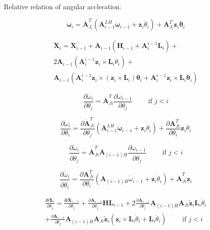 \documentclass{article}
\begin{document}
Relative relation of angular accleration:


\begin{equation}
	\mathbf{\dot \omega}_i = 
	\mathbf{\dot A}^{T}_{J_i}
(\mathbf{A}^{LH}_{i-1}\mathbf{\dot \omega}_{i-1}+\mathbf{z}_i\dot{\theta}_i) 
	+\mathbf{A}^T_{J_i}\mathbf{z}_i\mathbf{\ddot \theta}_{i}
\end{equation}

\begin{eqnarray}
\ddot{\mathbf X}_i=\ddot{\mathbf X}_{i-1} + \mathbf{\ddot A}_{i-1}
(\mathbf{H}_{i-1}+\mathbf{A}^{i-1}_i\mathbf{L}_i) +  \nonumber\\
2\mathbf{\dot A}_{i-1}
(\mathbf{A}^{i-1}_i{\mathbf z}_i{\times}\mathbf{L}_i\dot{\theta}_i) + \nonumber\\
\mathbf{A}_{i-1}
({\mathbf A}^{i-1}_i\mathbf{z}_i{\times}(\mathbf{z}_i{\times}{\mathbf L}_i)\mathbf{\dot \theta}_i+{\mathbf A}^{i-1}_i\mathbf{z}_i{\times}{\mathbf L}_i\mathbf{\ddot \theta}_i)
\end{eqnarray}

\begin{equation}
\frac{\partial \dot{\omega}_i}{\partial \theta_j}=\dot{\mathbf A}^T_{Ji}
\frac{\partial \dot{\omega}_{i-1}}{\partial \theta_j}
	\qquad \textrm{  if  } j < i
\end{equation}

\begin{equation}
\frac{\partial \dot{\omega}_i}{\partial \theta_i}=\frac{\partial \dot{\mathbf A}^T_{Ji}}{\partial \theta_j}
(\mathbf{A}^{LH}_{i-1}\mathbf{\dot \omega}_{i-1}+\mathbf{z}_i\dot{\theta}_i)+\frac{\partial \mathbf{A}^T_{Ji}}{\partial \theta_i}\mathbf{z}_i\ddot{\theta}_i 
\end{equation}


\begin{equation}
\frac{\partial \dot{\omega}_i}{\partial \dot{\theta}_j}=\dot{\mathbf A}^T_{Ji}\mathbf{A}_{(i-1)H}
\frac{\partial \dot{\omega}_{i-1}}{\partial \dot{\theta}_j}
	\qquad \textrm{  if  } j < i
\end{equation}

\begin{equation}
\frac{\partial \dot{\omega}_i}{\partial \dot{\theta}_i}=\frac{\partial {\mathbf A}^T_{Ji}}{\partial \theta_i}
(\mathbf{A}_{(i-1)H}\dot{\omega}_{i-1}+\mathbf{z}_i\dot{\theta}_i)+\mathbf{\dot A}^T_{Ji}\mathbf{z}_i
\end{equation}

\begin{eqnarray}
\frac{\mathbf{\partial \ddot X}_i}{\partial \theta_j}=
\frac{\mathbf{\partial \ddot X}_{i-1}}{\partial \theta_j}+\frac{\partial \mathbf{\ddot A}_{i-1}}{\partial \theta_j}\mathbf{HL}_{i-1}
+2\frac{\partial \mathbf{\dot A}_{i-1}}{\partial \theta_j}\mathbf{A}_{(i-1)H}\mathbf{A}_{Ji}\tilde{\mathbf z}_i\mathbf{L}_i\dot{\theta}_i 
\nonumber\\
+ \frac{\partial \mathbf{A}_{i-1}}{\partial \theta_j}\mathbf{A}_{(i-1)H}\mathbf{A}_{Ji}\tilde{\mathbf z}_i(\mathbf{z}_i\times\mathbf{L}_i\dot{\theta}_i+\mathbf{L}_i\ddot{\theta}_i)
	\qquad \textrm{  if  } j < i
\end{eqnarray}
\end{document}
